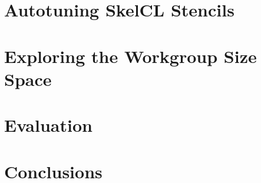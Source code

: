   \chapter{Autotuning SkelCL Stencils}\label{chap:omnitune-skelcl}
  



  \chapter{Exploring the Workgroup Size Space}\label{chap:methodology}
  


  \chapter{Evaluation}\label{chap:evaluation}
  


  \chapter{Conclusions}\label{chap:conclusions}
  


  \clearpage
  \label{bibliography}
  \printbibliography


